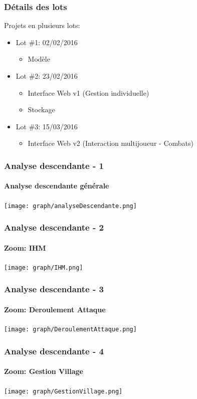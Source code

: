 \documentclass[aspectratio=169]{beamer}
\begin{document}
    \begin{frame}
        \frametitle{D\'etails des lots}
        Projets en plusieurs lots:
        \begin{itemize}
            \item Lot \#1: 02/02/2016\\
                \begin{itemize}
                    \item Modèle
                \end{itemize}
            \item Lot \#2: 23/02/2016
                \begin{itemize}
                    \item Interface Web v1 (Gestion individuelle)
                    \item Stockage
                \end{itemize}
            \item Lot \#3: 15/03/2016
                \begin{itemize}
                    \item Interface Web v2 (Interaction multijoueur - Combats)
                \end{itemize}
        \end{itemize}
    \end{frame}

    \begin{frame}
        \frametitle{Analyse descendante - 1}
        \framesubtitle{Analyse descendante générale}
        \begin{center}
            \texttt{[image: graph/analyseDescendante.png]}
        \end{center}
    \end{frame}
    \begin{frame}
        \frametitle{Analyse descendante - 2}
        \framesubtitle{Zoom: IHM}
        \begin{center}
            \texttt{[image: graph/IHM.png]}
        \end{center}
    \end{frame}
    \begin{frame}
        \frametitle{Analyse descendante - 3}
        \framesubtitle{Zoom: Deroulement Attaque}
        \begin{center}
            \texttt{[image: graph/DeroulementAttaque.png]}
        \end{center}
    \end{frame}
    \begin{frame}
        \frametitle{Analyse descendante - 4}
        \framesubtitle{Zoom: Gestion Village}
        \begin{center}
            \texttt{[image: graph/GestionVillage.png]}
        \end{center}
    \end{frame}
\end{document}
